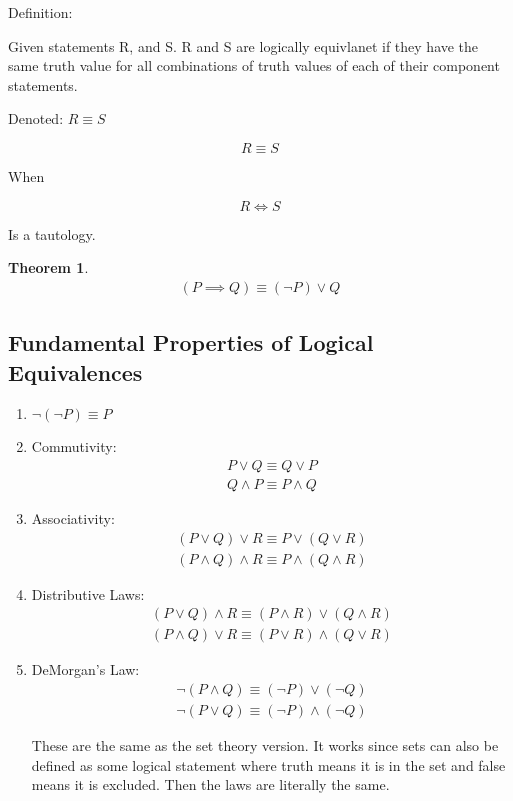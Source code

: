 \documentclass{report}
\newtheorem{thm}{Theorem}[section]
\begin{document}
Definition:
\begin{mdframed}
    Given statements R, and S. R and S are
    logically equivlanet if they have the same
    truth value for all combinations of truth
    values of each of their component statements.

    Denoted: $R \equiv S$
    

    \begin{displaymath}
        R \equiv S
    \end{displaymath}

    When

    \begin{displaymath}
        R \iff S
    \end{displaymath}

    Is a tautology.
\end{mdframed}


\begin{thm}
   \begin{gather}
        (P \implies Q) \equiv (\neg P) \lor Q
   \end{gather}     
\end{thm}

\subsection{Fundamental Properties of Logical Equivalences}

\begin{enumerate}
    \item $\neg (\neg P) \equiv P$
    \item Commutivity:
        \begin{gather}
           P \lor Q \equiv Q \lor P\\ 
           Q \land P \equiv P \land Q
        \end{gather}
    \item Associativity:
        \begin{gather}
            (P \lor Q) \lor R \equiv P \lor (Q \lor R)\\ 
            (P \land Q) \land R \equiv P \land (Q \land R)
        \end{gather}
    \item Distributive Laws:
        \begin{gather}
            (P \lor Q) \land R \equiv (P \land R) \lor (Q \land R)\\
            (P \land Q) \lor R \equiv (P \lor R) \land (Q \lor R)
        \end{gather}
    \item DeMorgan's Law:
        \begin{gather}
            \neg (P \land Q) \equiv (\neg P) \lor (\neg Q)\\
            \neg (P \lor Q) \equiv (\neg P) \land (\neg Q)
        \end{gather}

        These are the same as the set theory version. It works
        since sets can also be defined as some logical statement
        where truth means it is in the set and false means
        it is excluded. Then the laws are literally the same.
\end{enumerate}
\end{document}
